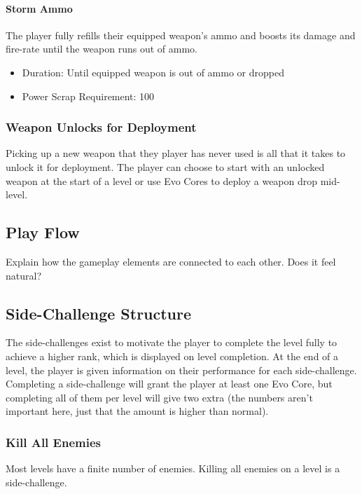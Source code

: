 \documentclass[12pt]{article}
\begin{document}
\paragraph{Storm Ammo}

The player fully refills their equipped weapon's ammo and boosts its damage and fire-rate until the weapon runs out of ammo.

\begin{itemize}
	\item Duration: Until equipped weapon is out of ammo or dropped 
	\item Power Scrap Requirement: 100
\end{itemize}

\subsubsection{Weapon Unlocks for Deployment}

Picking up a new weapon that they player has never used is all that it takes to unlock it for deployment. The player can choose to start with an unlocked weapon at the start of a level or use Evo Cores to deploy a weapon drop mid-level. 

\subsection{Play Flow}

Explain how the gameplay elements are connected to each other. Does it feel natural?

\subsection{Side-Challenge Structure}

The side-challenges exist to motivate the player to complete the level fully to achieve a higher rank, which is displayed on level completion. At the end of a level, the player is given information on their performance for each side-challenge. Completing a side-challenge will grant the player at least one Evo Core, but completing all of them per level will give two extra (the numbers aren't important here, just that the amount is higher than normal). 

\subsubsection{Kill All Enemies}

Most levels have a finite number of enemies. Killing all enemies on a level is a side-challenge.
\end{document}
